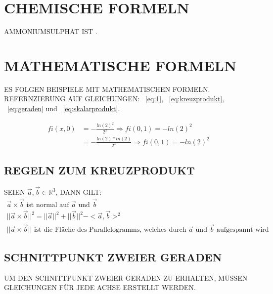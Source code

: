 \documentclass[conference,compsocl]{IEEEtran}
\begin{document}
\section{CHEMISCHE FORMELN}
AMMONIUMSULPHAT IST .

\section{MATHEMATISCHE FORMELN}
ES FOLGEN BEISPIELE MIT MATHEMATISCHEN FORMELN. REFERNZIERUNG AUF GLEICHUNGEN:
~\autoref{eq:1}, ~\autoref{eq:kreuzprodukt}, ~\autoref{eq:geraden} und
~\autoref{eq:skalarprodukt}.

\begin{equation}
  \label{eq:1}
  \begin{split}
    fi(x,0) & = -\frac{ln(2)^2}{2^x} \Rightarrow fi(0,1) = -ln(2)^2\\
            & = -\frac{ln(2) * ln(2)}{2^x} \Rightarrow fi(0,1) = -ln(2)^2
  \end{split}
\end{equation}
\subsection{REGELN ZUM KREUZPRODUKT}
SEIEN $ \vec{a}, \vec{b} \in \mathbb{R}^3 $, DANN GILT:
\begin{equation}
  \label{eq:kreuzprodukt}
  \begin{split}
    \vec{a} \times \vec{b} \text{ ist normal auf } \vec{a} \text{ und } \vec{b}\\
    || \vec{a} \times \vec{b} ||^2 = || \vec{a} ||^2 + || \vec{b} ||^2 - <\vec{a}, \vec{b}>^2\\
    || \vec{a} \times \vec{b} || \text{ ist die Fläche des
      Parallelogramms, welches durch } \vec{a} \text{ und } \vec{b}
    \text{ aufgespannt wird}
  \end{split}
\end{equation}

\subsection{SCHNITTPUNKT ZWEIER GERADEN}
UM DEN SCHNITTPUNKT ZWEIER GERADEN ZU ERHALTEN, MÜSSEN GLEICHUNGEN FÜR
JEDE ACHSE ERSTELLT WERDEN.
\end{document}
